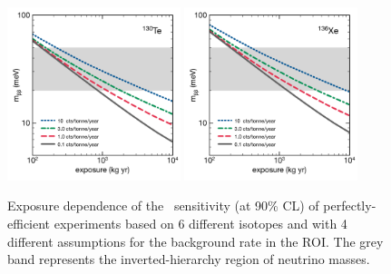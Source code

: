 \documentclass{PoS}
\begin{document}
\begin{figure}
\includegraphics[width=0.45\textwidth]{img/FutureTe130.pdf}
\includegraphics[width=0.45\textwidth]{img/FutureXe136.pdf}
\caption{Exposure dependence of the \mbb\ sensitivity (at 90\% CL) of perfectly-efficient experiments based on 6 different isotopes and with 4 different assumptions for the background rate in the ROI. The grey band represents the inverted-hierarchy region of neutrino masses.} \label{fig:FutureGen}
\end{figure}
\end{document}

